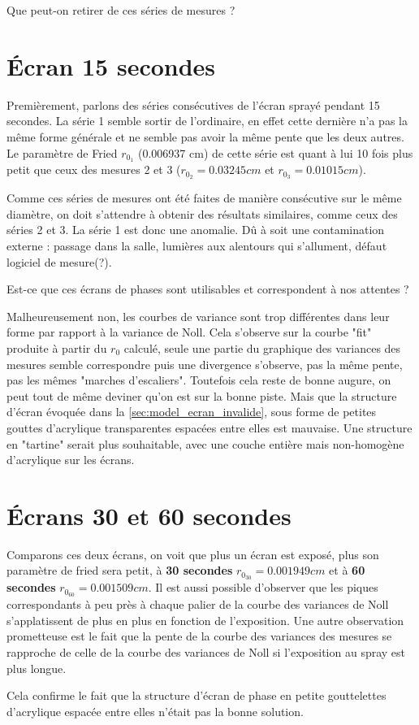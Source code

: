 Que peut-on retirer de ces séries de mesures ?

\section{Écran 15 secondes}
Premièrement, parlons des séries consécutives de l'écran sprayé pendant 15 secondes.
La série 1 semble sortir de l'ordinaire, en effet cette dernière n'a pas la même forme générale et ne semble pas avoir
la même pente que les deux autres. Le paramètre de Fried $r_{0_1}$ (0.006937 cm) de cette série est quant à lui 10 fois plus petit que
ceux des mesures 2 et 3 ($r_{0_2} = 0.03245 cm$ et $r_{0_3} = 0.01015 cm$).

Comme ces séries de mesures ont été faites de manière consécutive sur le même diamètre, on doit s'attendre à obtenir des résultats similaires,
comme ceux des séries 2 et 3. La série 1 est donc une anomalie. Dû à soit une contamination externe : passage dans la salle, lumières aux alentours qui s'allument,
défaut logiciel de mesure(?).

Est-ce que ces écrans de phases sont utilisables et correspondent à nos attentes ?

Malheureusement non, les courbes de variance sont trop différentes dans leur forme par rapport à la variance de Noll.
Cela s'observe sur la courbe "fit" produite à partir du $r_0$ calculé, seule une partie du graphique des variances des mesures semble
correspondre puis une divergence s'observe, pas la même pente, pas les mêmes "marches d'escaliers".
\label{sec:invalidation_écrans}
Toutefois cela reste de bonne augure, on peut tout de même deviner qu'on est sur la bonne piste.
Mais que la structure d'écran évoquée dans la \autoref{sec:model_ecran_invalide}, sous forme de petites gouttes d'acrylique transparentes espacées entre
elles est mauvaise. Une structure en "tartine" serait plus souhaitable, avec une couche entière mais non-homogène d'acrylique sur les écrans.

\section{Écrans 30 et 60 secondes}
Comparons ces deux écrans, on voit que plus un écran est exposé, plus son paramètre de fried sera petit, à \textbf{30 secondes} $r_{0_{30}} = 0.001949 cm$ et à \textbf{60 secondes}
$r_{0_{60}} = 0.001509 cm$. Il est aussi possible d'observer que les piques correspondants à peu près à chaque palier de la courbe des variances de Noll s'applatissent de plus en plus en fonction de l'exposition.
Une autre observation prometteuse est le fait que la pente de la courbe des variances des mesures se rapproche de celle de la courbe des variances de Noll si l'exposition au spray est plus longue.

Cela confirme le fait que la structure d'écran de phase en petite gouttelettes d'acrylique espacée entre elles n'était pas la bonne solution.
